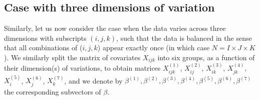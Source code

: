 \documentclass[12pt]{article}
\begin{document}
\subsection{Case with three dimensions of variation}
Similarly, let us now consider the case when the data varies across three dimensions with subscripts $(i,j,k)$, such that the data is balanced in the sense that all combinations of ($i,j,k$) appear exactly once (in which case $N = I \times J \times K$). We similarly split the matrix of covariates $X_{ijk}$ into six groups, as a function of their dimension(s) of variations, to obtain matrices $X^{(1)}_{ijk}$, $X^{(2)}_{ij}$, $X^{(3)}_{ik}$, $X^{(4)}_{jk}$, $X^{(5)}_{i}$, $X^{(6)}_{j}$, $X^{(7)}_{k}$, and we denote by $\beta^{(1)}, \beta^{(2)}, \beta^{(3)}, \beta^{(4)}, \beta^{(5)}, \beta^{(6)}, \beta^{(7)}$ the corresponding subvectors of $\beta$.
\end{document}

